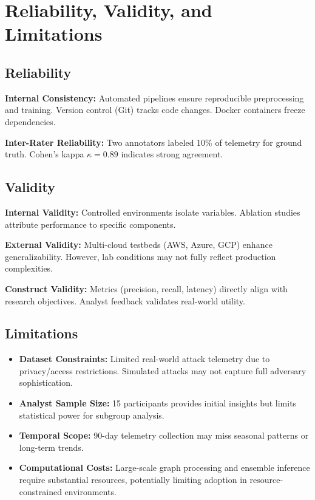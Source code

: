 \section{Reliability, Validity, and Limitations}\label{sec:method-reliability}
\subsection{Reliability}
\textbf{Internal Consistency:} Automated pipelines ensure reproducible preprocessing and training. Version control (Git) tracks code changes. Docker containers freeze dependencies.

\textbf{Inter-Rater Reliability:} Two annotators labeled 10\% of telemetry for ground truth. Cohen's kappa $\kappa = 0.89$ indicates strong agreement.

\subsection{Validity}
\textbf{Internal Validity:} Controlled environments isolate variables. Ablation studies attribute performance to specific components.

\textbf{External Validity:} Multi-cloud testbeds (AWS, Azure, GCP) enhance generalizability. However, lab conditions may not fully reflect production complexities.

\textbf{Construct Validity:} Metrics (precision, recall, latency) directly align with research objectives. Analyst feedback validates real-world utility.

\subsection{Limitations}
\begin{itemize}
    \item \textbf{Dataset Constraints:} Limited real-world attack telemetry due to privacy/access restrictions. Simulated attacks may not capture full adversary sophistication.
    \item \textbf{Analyst Sample Size:} 15 participants provides initial insights but limits statistical power for subgroup analysis.
    \item \textbf{Temporal Scope:} 90-day telemetry collection may miss seasonal patterns or long-term trends.
    \item \textbf{Computational Costs:} Large-scale graph processing and ensemble inference require substantial resources, potentially limiting adoption in resource-constrained environments.
\end{itemize}


